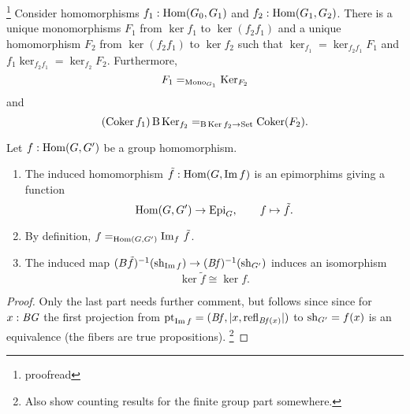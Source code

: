 \begin{xca}\footnote{proofread}
  Consider homomorphisms $f_1:\Hom(G_0,G_1)$ and $f_2:\Hom(G_1,G_2)$.
  There is a unique monomorphisms $F_1$ from $\ker f_1$ to $\ker(f_2f_1)$ and a unique homomorphism $F_2$ from $\ker(f_2f_1)$ to $\ker f_2$ such that $\ker_{f_1}=\ker_{f_2f_1}F_1$ and $f_1\ker_{f_2f_1}=\ker_{f_2}F_2$.
  Furthermore, $$F_1=_{\typemono_{G_1}}\ker_{F_2}$$ and $$(\coker f_1)\,\B\ker_{f_2}=_{\B\Ker f_2\to\Set}\coker (F_2).$$ 
\end{xca}



\begin{lemma}
  \label{lem:kerandcoker}
  \label{lem:countinggps}
  Let $f:\Hom(G,G')$ be a group homomorphism.
  \begin{enumerate}
  \item The induced homomorphism $\tilde f:\Hom(G,\image f)$ is an epimorphims giving a function
    $$\Hom(G,G')\to\typeepi_G,\qquad f\mapsto\tilde f.$$
  \item By definition, $f=_{\Hom(G,G')}\image_f\,\tilde f$. %
  \item The induced map $(B\tilde f)^{-1}(\sh_{\image f})\to (\Bf)^{-1}(\sh_{G'})$ induces an isomorphism
  $$\ker\tilde f\cong \ker f.$$
  \end{enumerate}

\end{lemma}
\begin{proof}
Only the last part needs further comment, but follows since since for $x:\mathit{B}\mathit{G}$ the first projection from $\pt_{\image f}=(\Bf,|x,\refl{\Bf(x)}|)$ to $\mathrm{sh}_{G'}=f(x)$ is an equivalence (the fibers are true propositions).
  \footnote{\color{blue}  
 Also show counting results for the finite group part somewhere.} 
\end{proof}

